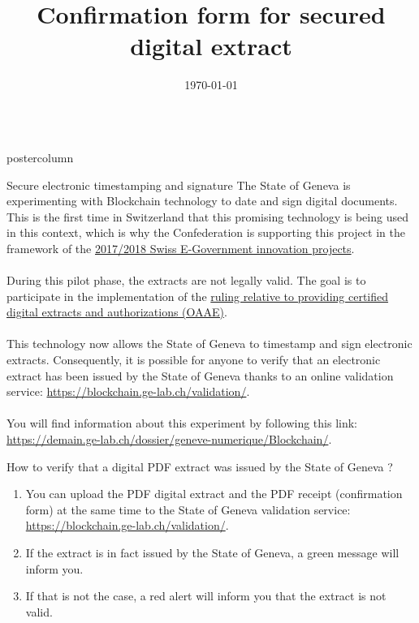 \documentclass[roundedcorners=true, titleposition=center]{beamerthemeruhuisstijlposter}
\title{Confirmation form for secured digital extract}
\date{\today}
\begin{document}
\begin{frame}
\begin{columns}
\begin{column}{0.95\textwidth}
\begin{beamercolorbox}[center, wd=\textwidth]{postercolumn}
\begin{minipage}[T]{0.95\textwidth}
\parbox[t][\columnheight]{\textwidth}{%
\begin{block}{Secure electronic timestamping and signature}
The State of Geneva is experimenting with Blockchain technology to date and sign digital documents. This is the first time in Switzerland that this promising technology is being used in this context, which is why the Confederation is supporting this project in the framework of the \href{https://www.egovernment.ch/en/umsetzung/innovationen/innovations-20172018/}{2017/2018 Swiss E-Government innovation projects}.
\\
\\
During this pilot phase, the extracts are not legally valid. The goal is to participate in the implementation of the \href{https://www.ejpd.admin.ch/ejpd/fr/home/aktuell/news/2016/2016-09-07.html}{ruling relative to providing certified digital extracts and authorizations (OAAE)}.
\\
\\
This technology now allows the State of Geneva to timestamp and sign electronic extracts. Consequently, it is possible for anyone to verify that an electronic extract has been issued by the State of Geneva thanks to an online validation service: \href{https://blockchain.ge-lab.ch/validation/}{https://blockchain.ge-lab.ch/validation/}.
\\
\\
You will find information about this experiment by following this link: \href{https://demain.ge-lab.ch/dossier/geneve-numerique/Blockchain/}{https://demain.ge-lab.ch/dossier/geneve-numerique/Blockchain/}.
\end{block}
\medskip
\begin{block}{How to verify that a digital PDF extract was issued by the State of Geneva ?}
\begin{enumerate}
\item You can upload the PDF digital extract and the PDF receipt (confirmation form) at the same time to the State of Geneva validation service: \href{https://blockchain.ge-lab.ch/validation/}{https://blockchain.ge-lab.ch/validation/}.
\item If the extract is in fact issued by the State of Geneva, a green message will inform you.
\item If that is not the case, a red alert will inform you that the extract is not valid.
\end{enumerate}
\end{block}
}
\end{minipage}
\end{beamercolorbox}
\end{column}
\end{columns}
\end{frame}
\end{document}
